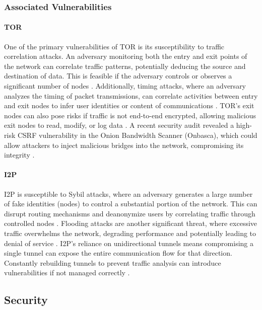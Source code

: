 \documentclass[12pt,conference]{IEEEtran}
\begin{document}
\subsubsection{Associated Vulnerabilities}
\paragraph{TOR} One of the primary vulnerabilities of TOR is its susceptibility to traffic correlation attacks. An adversary monitoring both the entry and exit points of the network can correlate traffic patterns, potentially deducing the source and destination of data. This is feasible if the adversary controls or observes a significant number of nodes \cite{TORVsI2P}. Additionally, timing attacks, where an adversary analyzes the timing of packet transmissions, can correlate activities between entry and exit nodes to infer user identities or content of communications \cite{aSurveyOnTORAndI2P}. TOR's exit nodes can also pose risks if traffic is not end-to-end encrypted, allowing malicious exit nodes to read, modify, or log data \cite{TORVsI2P}. A recent security audit revealed a high-risk CSRF vulnerability in the Onion Bandwidth Scanner (Onbasca), which could allow attackers to inject malicious bridges into the network, compromising its integrity \cite{torCodeAudits}.
\paragraph{I2P} I2P is susceptible to Sybil attacks, where an adversary generates a large number of fake identities (nodes) to control a substantial portion of the network. This can disrupt routing mechanisms and deanonymize users by correlating traffic through controlled nodes \cite{aSurveyOnTORAndI2P}\cite{TORVsI2P}. Flooding attacks are another significant threat, where excessive traffic overwhelms the network, degrading performance and potentially leading to denial of service \cite{aSurveyOnTORAndI2P}. I2P's reliance on unidirectional tunnels means compromising a single tunnel can expose the entire communication flow for that direction. Constantly rebuilding tunnels to prevent traffic analysis can introduce vulnerabilities if not managed correctly \cite{aSurveyOnTORAndI2P}.


\subsection{Security}
\end{document}

